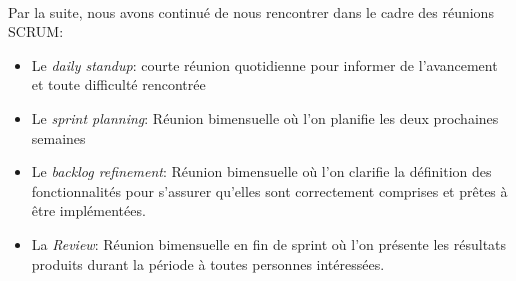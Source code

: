 \paragraph{}
Par la suite, nous avons continué de nous rencontrer dans le cadre des réunions SCRUM:
\begin{itemize}
    \item Le \textit{daily standup}: courte réunion quotidienne pour informer de l'avancement et toute difficulté rencontrée
    \item Le \textit{sprint planning}: Réunion bimensuelle où l'on planifie les deux prochaines semaines
    \item Le \textit{backlog refinement}: Réunion bimensuelle où l'on clarifie la définition des fonctionnalités pour s'assurer qu'elles sont correctement comprises et prêtes à être implémentées.
    \item La \textit{Review}: Réunion bimensuelle en fin de sprint où l'on présente les résultats produits durant la période à toutes personnes intéressées.
\end{itemize}
